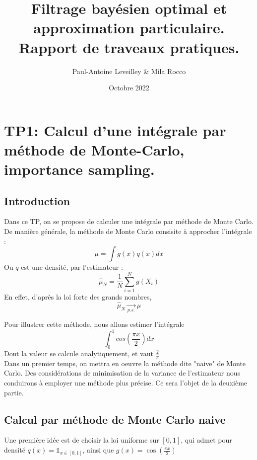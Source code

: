 \documentclass{article}
\title{Filtrage bayésien optimal et approximation particulaire. Rapport de traveaux pratiques.}
\author{Paul-Antoine Leveilley \& Mila Rocco}
\date{Octobre 2022}
\begin{document}
\maketitle

\newpage
\tableofcontents
\newpage
\listoffigures
\newpage








\newpage
\section{TP1: Calcul d'une intégrale par méthode de Monte-Carlo, importance sampling.}
\subsection{Introduction}
Dans ce TP, on se propose de calculer une intégrale par méthode de Monte Carlo. De manière générale, la méthode de Monte Carlo
consisite à approcher l'intégrale : 
\[\mu = \int g(x)q(x)dx\] 
Ou $q$ est une densité, par l'estimateur : 
\begin{equation}
  \label{estim}
  \hat{\mu}_N = \frac{1}{N} \sum_{i=1}^N g(X_i)
\end{equation}
En effet, d'après la loi forte des grands nombres, 
\[\hat{\mu}_N\underset{p.s.}{\longrightarrow}\mu \] 

Pour illustrer cette méthode, nous allons estimer l'intégrale 
\[\int_0^1 cos(\frac{\pi x}{2})dx\]
Dont la valeur se calcule analytiquement, et vaut $\frac{2}{\pi}$ \\
Dans un premier temps, on mettra en oeuvre la méthode dite "naive" de Monte Carlo. Des considérations de minimisation de
la variance de l'estimateur nous conduirons à employer une méthode
plus précise. Ce sera l'objet de la deuxième partie.\\ 

 \subsection{Calcul par méthode de Monte Carlo naive}
Une première idée est de choisir la loi uniforme sur $[0,1]$, qui admet pour densité $q(x) = \mathbb{1}_{x \in [0,1]}$, ainsi que $g(x) = \cos (\frac{\pi x}{2})$
\end{document}
